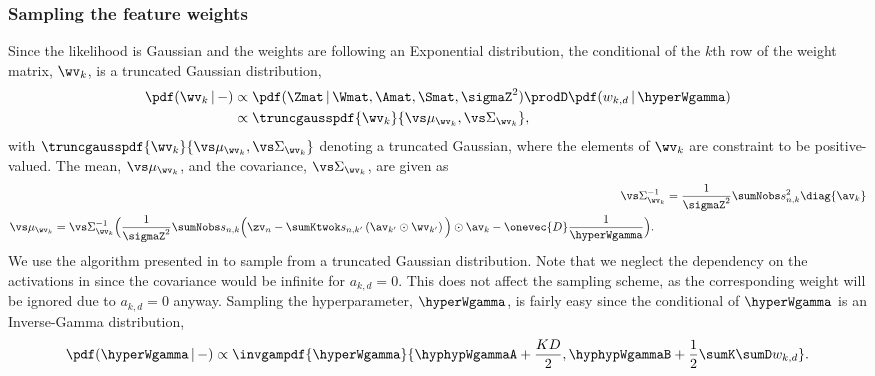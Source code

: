 \documentclass{article}
\begin{document}
\subsubsection{Sampling the feature weights}
Since the likelihood is Gaussian and the weights are \iid following an Exponential distribution, the conditional of the $k$th row of the weight matrix, $\wv_k$, is a truncated Gaussian distribution,
\begin{align*}
\pdf(\wv_k\,|\,-) & \propto \pdf(\Zmat\,|\, \Wmat, \Amat, \Smat, \sigmaZ^2) \prodD \pdf(w_{k,d} \,|\, \hyperWgamma)
                  \\ & \propto \truncgausspdf{\wv_{k}}{\vs \mu_{\wv_k}, \vs \Sigma_{\wv_k}},
\end{align*}
with $\truncgausspdf{\wv_{k}}{\vs \mu_{\wv_k}, \vs \Sigma_{\wv_k}}$ denoting a truncated Gaussian, where the elements of $\wv_k$ are constraint to be positive-valued.
The mean, $\vs \mu_{\wv_k}$, and the covariance, $\vs \Sigma_{\wv_k}$, are given as
\begin{align}
    \vs \Sigma_{\wv_k}^{-1} & = \frac{1}{\sigmaZ^2} \sumNobs s_{n,k}^2 \diag{\av_k} \label{eq::inf::cov}
    \\ \begin{split} \vs \mu_{\wv_k}         & = \vs \Sigma_{\wv_k}^{-1} \Big( \frac{1}{\sigmaZ^2} \sumNobs s_{n,k} 
                        \Big( \zv_n - \sumKtwok s_{n,k'} \left(\av_{k'} \odot \wv_{k'}\right) \Big) \odot \av_{k}
                        - \onevec{D} \frac{1}{\hyperWgamma} \Big). \end{split}
\end{align}
We use the algorithm presented in \cite{Chopin2010} to sample from a truncated Gaussian distribution.
Note that we neglect the dependency on the activations in  since the covariance would be infinite for $a_{k,d}=0$. 
This does not affect the sampling scheme, as the corresponding weight will be ignored due to $a_{k,d}=0$ anyway.
Sampling the hyperparameter, $\hyperWgamma$, is fairly easy since the conditional of $\hyperWgamma$ is an Inverse-Gamma distribution,
\begin{align*}
 \pdf(\hyperWgamma\,|\,-) \propto \invgampdf{\hyperWgamma}{\hyphypWgammaA + \frac{KD}{2}, \hyphypWgammaB + \frac{1}{2} \sumK \sumD w_{k,d}}.
\end{align*}
\end{document}
